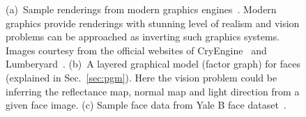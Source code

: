\begin{figure}[th!]
{
		\label{fig:face-model}
	}
  {(a)~Sample renderings from modern graphics engines~\cite{cryengine,lumberyard}.
  Modern graphics provide renderings with stunning level of realism and vision
  problems can be approached as inverting such graphics systems. Images courtesy
  from the official websites of CryEngine~\cite{cryengine} and Lumberyard~\cite{lumberyard}.
  (b)~A layered graphical model (factor graph) for faces (explained in Sec.~\ref{sec:pgm}).
	Here the vision problem
  could be inferring the reflectance map, normal map and light direction from a given
  face image. (c) Sample face data from Yale B face dataset~\cite{Georghiades2001,Lee2005}.}
	\label{fig:sample-gen-models}
\end{figure}

